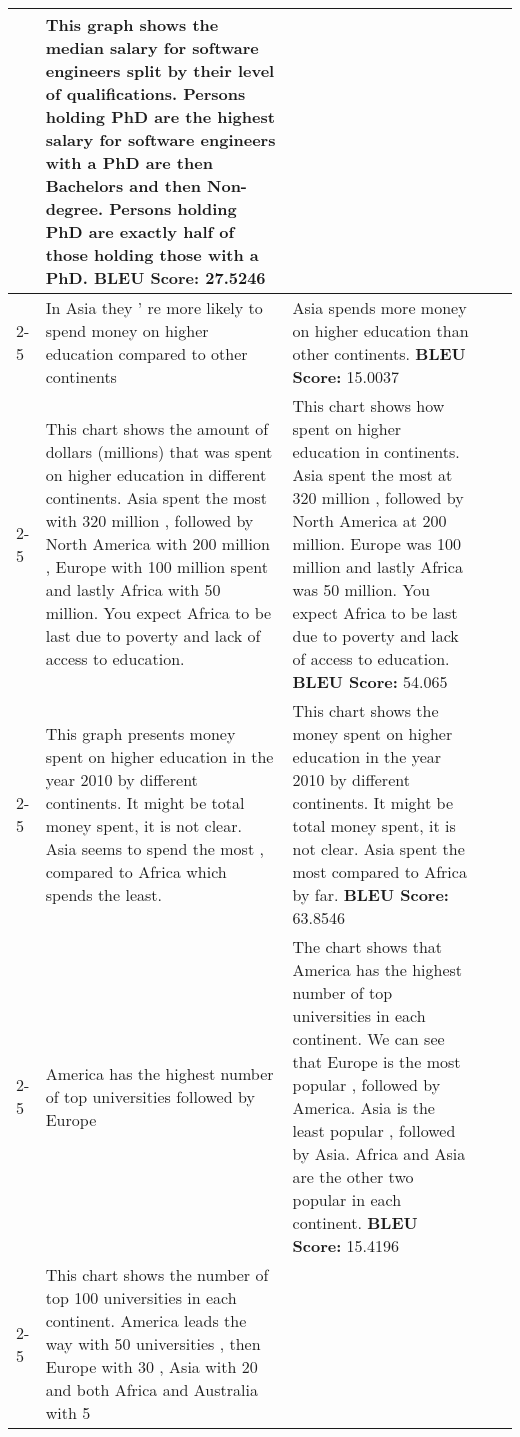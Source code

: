\documentclass[]{article}
\begin{document}
\begin{landscape}
\begin{longtable}{|p{13mm}|p{57mm}|p{57mm}|p{57mm}|p{57mm}|}
 & This graph shows the median salary for software engineers split by their level of qualifications. Persons holding PhD are the highest salary for software engineers with a PhD are then Bachelors and then Non-degree. Persons holding PhD are exactly half of those holding those with a PhD.
\newline \textbf{BLEU Score: }27.5246\\ \cline{2-5}\hline\multirow{2}{*}{Chart 5}&In Asia they ' re more likely to spend money on higher education compared to other continents 
 & Asia spends more money on higher education than other continents.
\newline \textbf{BLEU Score: }15.0037\\ \cline{2-5}&This chart shows the amount of dollars (millions) that was spent on higher education in different continents. Asia spent the most with 320 million , followed by North America with 200 million , Europe with 100 million spent and lastly Africa with 50 million. You expect Africa to be last due to poverty and lack of access to education. 
 & This chart shows how spent on higher education in continents. Asia spent the most at 320 million , followed by North America at 200 million. Europe was 100 million and lastly Africa was 50 million. You expect Africa to be last due to poverty and lack of access to education.
\newline \textbf{BLEU Score: }54.065\\ \cline{2-5}&This graph presents money spent on higher education in the year 2010 by different continents. It might be total money spent, it is not clear. Asia seems to spend the most , compared to Africa which spends the least. 
 & This chart shows the money spent on higher education in the year 2010 by different continents. It might be total money spent, it is not clear. Asia spent the most compared to Africa by far.
\newline \textbf{BLEU Score: }63.8546\\ \cline{2-5}\hline\multirow{2}{*}{Chart 6}&America has the highest number of top universities followed by Europe 
 & The chart shows that America has the highest number of top universities in each continent. We can see that Europe is the most popular , followed by America. Asia is the least popular , followed by Asia. Africa and Asia are the other two popular in each continent.
\newline \textbf{BLEU Score: }15.4196\\ \cline{2-5}&This chart shows the number of top 100 universities in each continent. America leads the way with 50 universities , then Europe with 30 , Asia with 20 and both Africa and Australia with 5 

\end{longtable}
\end{landscape}
\end{document}
